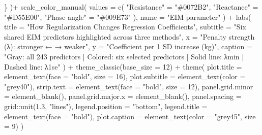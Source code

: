 \documentclass[
  letterpaper,
  DIV=11,
  numbers=noendperiod]{scrreprt}
\newenvironment{Shaded}{\begin{snugshade}}{\end{snugshade}}
\newcommand{\AttributeTok}[1]{\textcolor[rgb]{0.40,0.45,0.13}{#1}}
\newcommand{\DecValTok}[1]{\textcolor[rgb]{0.68,0.00,0.00}{#1}}
\newcommand{\FloatTok}[1]{\textcolor[rgb]{0.68,0.00,0.00}{#1}}
\newcommand{\FunctionTok}[1]{\textcolor[rgb]{0.28,0.35,0.67}{#1}}
\newcommand{\NormalTok}[1]{\textcolor[rgb]{0.00,0.23,0.31}{#1}}
\newcommand{\OtherTok}[1]{\textcolor[rgb]{0.00,0.23,0.31}{#1}}
\newcommand{\SpecialCharTok}[1]{\textcolor[rgb]{0.37,0.37,0.37}{#1}}
\newcommand{\StringTok}[1]{\textcolor[rgb]{0.13,0.47,0.30}{#1}}
\begin{document}
\begin{Shaded}
\begin{Highlighting}[]
\NormalTok{    \}}
\NormalTok{  )}\SpecialCharTok{+}
  \FunctionTok{scale\_color\_manual}\NormalTok{(}
    \AttributeTok{values =} \FunctionTok{c}\NormalTok{(}
      \StringTok{"Resistance"} \OtherTok{=} \StringTok{"\#0072B2"}\NormalTok{,}
      \StringTok{"Reactance"} \OtherTok{=} \StringTok{"\#D55E00"}\NormalTok{,}
      \StringTok{"Phase angle"} \OtherTok{=} \StringTok{"\#009E73"}
\NormalTok{    ),}
    \AttributeTok{name =} \StringTok{"EIM parameter"}
\NormalTok{  ) }\SpecialCharTok{+}
  \FunctionTok{labs}\NormalTok{(}
    \AttributeTok{title =} \StringTok{"How Regularization Changes Regression Coefficients"}\NormalTok{,}
    \AttributeTok{subtitle =} \StringTok{"Six shared EIM predictors highlighted across three methods"}\NormalTok{,}
    \AttributeTok{x =} \StringTok{"Penalty strength (λ): stronger ← → weaker"}\NormalTok{,}
    \AttributeTok{y =} \StringTok{"Coefficient per 1 SD increase (kg)"}\NormalTok{,}
    \AttributeTok{caption =} \StringTok{"Gray: all 243 predictors | Colored: six selected predictors | Solid line: λmin | Dashed line: λ1se"}
\NormalTok{  ) }\SpecialCharTok{+}
  \FunctionTok{theme\_classic}\NormalTok{(}\AttributeTok{base\_size =} \DecValTok{12}\NormalTok{) }\SpecialCharTok{+}
  \FunctionTok{theme}\NormalTok{(}
    \AttributeTok{plot.title =} \FunctionTok{element\_text}\NormalTok{(}\AttributeTok{face =} \StringTok{"bold"}\NormalTok{, }\AttributeTok{size =} \DecValTok{16}\NormalTok{),}
    \AttributeTok{plot.subtitle =} \FunctionTok{element\_text}\NormalTok{(}\AttributeTok{color =} \StringTok{"grey40"}\NormalTok{),}
    \AttributeTok{strip.text =} \FunctionTok{element\_text}\NormalTok{(}\AttributeTok{face =} \StringTok{"bold"}\NormalTok{, }\AttributeTok{size =} \DecValTok{12}\NormalTok{),}
    \AttributeTok{panel.grid.minor =} \FunctionTok{element\_blank}\NormalTok{(),}
    \AttributeTok{panel.grid.major.x =} \FunctionTok{element\_blank}\NormalTok{(),}
    \AttributeTok{panel.spacing =}\NormalTok{ grid}\SpecialCharTok{::}\FunctionTok{unit}\NormalTok{(}\FloatTok{1.3}\NormalTok{, }\StringTok{"lines"}\NormalTok{),}
    \AttributeTok{legend.position =} \StringTok{"bottom"}\NormalTok{,}
    \AttributeTok{legend.title =} \FunctionTok{element\_text}\NormalTok{(}\AttributeTok{face =} \StringTok{"bold"}\NormalTok{),}
    \AttributeTok{plot.caption =} \FunctionTok{element\_text}\NormalTok{(}\AttributeTok{color =} \StringTok{"grey45"}\NormalTok{, }\AttributeTok{size =} \DecValTok{9}\NormalTok{)}
\NormalTok{  )}
\end{Highlighting}
\end{Shaded}
\end{document}
